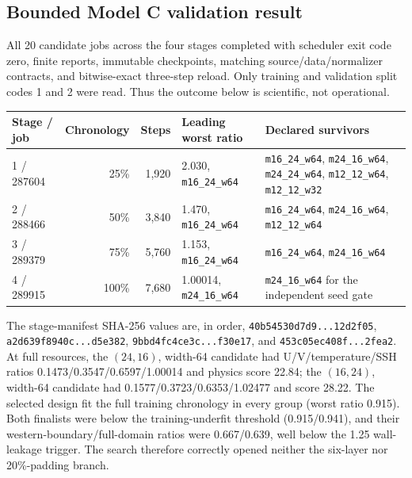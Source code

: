 \documentclass[11pt]{article}
\begin{document}
\subsection{Bounded Model C validation result}

All 20 candidate jobs across the four stages completed with scheduler exit code zero,
finite reports, immutable checkpoints, matching source/data/normalizer contracts, and
bitwise-exact three-step reload.  Only training and validation split codes 1 and 2
were read.  Thus the outcome below is scientific, not operational.

\begin{center}\small
\begin{tabular}{@{}lrrlp{}@{}}
\toprule
\textbf{Stage / job} & \textbf{Chronology} & \textbf{Steps} &
\textbf{Leading worst ratio} & \textbf{Declared survivors} \\
\midrule
1 / 287604 & 25\% & 1,920 & 2.030, \texttt{m16\_24\_w64} &
\texttt{m16\_24\_w64}, \texttt{m24\_16\_w64}, \texttt{m24\_24\_w64},
\texttt{m12\_12\_w64}, \texttt{m12\_12\_w32} \\
2 / 288466 & 50\% & 3,840 & 1.470, \texttt{m16\_24\_w64} &
\texttt{m16\_24\_w64}, \texttt{m24\_16\_w64}, \texttt{m12\_12\_w64} \\
3 / 289379 & 75\% & 5,760 & 1.153, \texttt{m16\_24\_w64} &
\texttt{m16\_24\_w64}, \texttt{m24\_16\_w64} \\
4 / 289915 & 100\% & 7,680 & 1.00014, \texttt{m24\_16\_w64} &
\texttt{m24\_16\_w64} for the independent seed gate \\
\bottomrule
\end{tabular}
\end{center}

The stage-manifest SHA-256 values are, in order,
\texttt{40b54530d7d9...12d2f05}, \texttt{a2d639f8940c...d5e382},
\texttt{9bbd4fc4ce3c...f30e17}, and \texttt{453c05ec408f...2fea2}.
At full resources, the \((24,16)\), width-64 candidate had
U/V/temperature/SSH ratios 0.1473/0.3547/0.6597/1.00014 and physics score 22.84;
the \((16,24)\), width-64 candidate had 0.1577/0.3723/0.6353/1.02477 and score 28.22.
The selected design fit the full training chronology in every group
(worst ratio 0.915).  Both finalists were below the training-underfit threshold
(0.915/0.941), and their western-boundary/full-domain ratios were 0.667/0.639,
well below the 1.25 wall-leakage trigger.  The search therefore correctly opened
neither the six-layer nor 20\%-padding branch.
\end{document}
